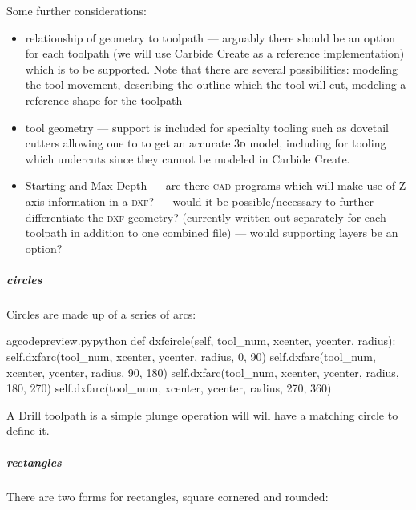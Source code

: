 \documentclass{ltxdoc}
\begin{document}
 
Some further considerations:

\begin{itemize}
 \item relationship of geometry to toolpath --- arguably there should be an option for each
       toolpath (we will use Carbide Create as a reference implementation) which is to be 
       supported. Note that there are several possibilities: modeling the tool movement, 
       describing the outline which the tool will cut, modeling a reference shape for the toolpath
 \item tool geometry --- support is included for specialty tooling 
       such as dovetail cutters allowing one to to get an accurate \textsc{3d} model, including for tooling which
       undercuts since they cannot be modeled in Carbide Create.
 \item Starting and Max Depth --- are there \textsc{cad} programs which will make use of Z-axis information 
       in a \textsc{dxf}? --- would it be possible/necessary to further differentiate the \textsc{dxf} geometry?
       (currently  written out separately for each toolpath in addition to one combined file) --- would supporting layers be an option?
\end{itemize}

\subparagraph{circles}

Circles are made up of a series of arcs:

\lstset{firstnumber=\thegcpy}
\begin{writecode}{a}{gcodepreview.py}{python}
    def dxfcircle(self, tool_num, xcenter, ycenter, radius):
        self.dxfarc(tool_num, xcenter, ycenter, radius,  0, 90)
        self.dxfarc(tool_num, xcenter, ycenter, radius, 90, 180)
        self.dxfarc(tool_num, xcenter, ycenter, radius, 180, 270)
        self.dxfarc(tool_num, xcenter, ycenter, radius, 270, 360)

\end{writecode}
\addtocounter{gcpy}{6}

A Drill toolpath is a simple plunge operation will will have a matching circle to define it.

\subparagraph{rectangles}

There are two forms for rectangles, square cornered and rounded:
\end{document}
